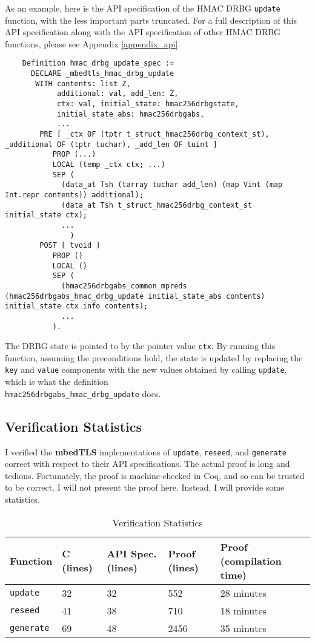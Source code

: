 \documentclass[pageno]{jpaper}
\newcommand{\stdtitle}[1]{\textbf{#1}}
\begin{document}
As an example, here is the API specification of the HMAC DRBG \lstinline{update} function, with the less important parts truncated. For a full description of this API specification along with the API specification of other HMAC DRBG functions, please see Appendix \ref{appendix_api}.

\begin{lstlisting}
    Definition hmac_drbg_update_spec :=
      DECLARE _mbedtls_hmac_drbg_update
       WITH contents: list Z,
            additional: val, add_len: Z,
            ctx: val, initial_state: hmac256drbgstate,
            initial_state_abs: hmac256drbgabs,
            ...
        PRE [ _ctx OF (tptr t_struct_hmac256drbg_context_st), _additional OF (tptr tuchar), _add_len OF tuint ]
           PROP (...)
           LOCAL (temp _ctx ctx; ...)
           SEP (
             (data_at Tsh (tarray tuchar add_len) (map Vint (map Int.repr contents)) additional);
             (data_at Tsh t_struct_hmac256drbg_context_st initial_state ctx);
             ...
               )
        POST [ tvoid ]
           PROP ()
           LOCAL ()
           SEP (
             (hmac256drbgabs_common_mpreds (hmac256drbgabs_hmac_drbg_update initial_state_abs contents) initial_state ctx info_contents);
             ...
           ).
\end{lstlisting}

The DRBG state is pointed to by the pointer value \lstinline{ctx}. By running this function, assuming the preconditions hold, the state is updated by replacing the \lstinline{key} and \lstinline{value} components with the new values obtained by calling \lstinline{update}, which is what the definition \\ \lstinline{hmac256drbgabs_hmac_drbg_update} does.

\subsection{Verification Statistics}

I verified the \stdtitle{mbedTLS} implementations of \lstinline{update}, \lstinline{reseed}, and \lstinline{generate} correct with respect to their API specifications. The actual proof is long and tedious. Fortunately, the proof is machine-checked in Coq, and so can be trusted to be correct. I will not present the proof here. Instead, I will provide some statistics.

\begin{table}[h!]
  \centering
  \begin{tabular}{|l|l|l|l|l|}
    \hline
    \textbf{Function} & \textbf{C (lines)} & \textbf{API Spec. (lines)} & \textbf{Proof (lines)} & \textbf{Proof (compilation time)}\\
    \hline
    \hline
    \lstinline{update} & 32 & 32 & 552 & 28 minutes \\
    \hline
    \lstinline{reseed} & 41 & 38 & 710 & 18 minutes \\
    \hline
    \lstinline{generate} & 69 & 48 & 2456 & 35 minutes \\
    \hline
  \end{tabular}
  \caption{Verification Statistics}
  \label{table:stats}
\end{table}
\end{document}
